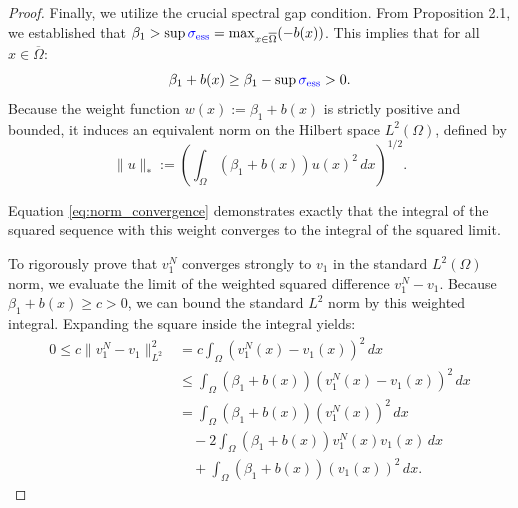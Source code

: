 \documentclass[12pt, a4paper]{article}
\newcommand{\revision}[1]{\textcolor{blue}{#1}}
\theoremstyle{break}
\theoremstyle{break}
\theoremstyle{break}
\theoremstyle{break}
\theoremstyle{break}
\theoremstyle{break}
\theoremstyle{break}
\theoremstyle{break}
\theoremstyle{break}
\begin{document}
\begin{proof}
    Finally, we utilize the crucial spectral gap condition. From Proposition 2.1, we established that $\beta_1 > \sup \revision{\sigma_{\mathrm{ess}}} = \max_{x \in \overline{\Omega}} (-b(x))$. This implies that for all $x \in \overline{\Omega}$:
    \begin{equation}
        \beta_1 + b(x) \geq \beta_1 - \sup \revision{\sigma_{\mathrm{ess}}} > 0.
    \end{equation}
    Because the weight function $w(x) := \beta_1 + b(x)$ is strictly positive and bounded, it induces an equivalent norm on the Hilbert space $L^2(\Omega)$, defined by
    \begin{equation}
        \|u\|_{*} := \left( \int_\Omega (\beta_1 + b(x)) u(x)^2 \, dx \right)^{1/2}.
    \end{equation}
    
    Equation \eqref{eq:norm_convergence} demonstrates exactly that the integral of the squared sequence with this weight converges to the integral of the squared limit. 
    
    To rigorously prove that $v_1^N$ converges strongly to $v_1$ in the standard $L^2(\Omega)$ norm, we evaluate the limit of the weighted squared difference $v_1^N - v_1$. Because $\beta_1 + b(x) \geq c > 0$, we can bound the standard $L^2$ norm by this weighted integral. Expanding the square inside the integral yields:
    \begin{align}
        0 \leq c \|v_1^N - v_1\|_{L^2}^2 &= c \int_\Omega (v_1^N(x) - v_1(x))^2 \, dx \nonumber \\
        &\leq \int_\Omega (\beta_1 + b(x))(v_1^N(x) - v_1(x))^2 \, dx \nonumber \\
        &= \int_\Omega (\beta_1 + b(x))(v_1^N(x))^2 \, dx \nonumber \\
        &\quad - 2 \int_\Omega (\beta_1 + b(x))v_1^N(x)v_1(x) \, dx \nonumber \\
        &\quad + \int_\Omega (\beta_1 + b(x))(v_1(x))^2 \, dx.
    \end{align}
    

\end{proof}
\end{document}

